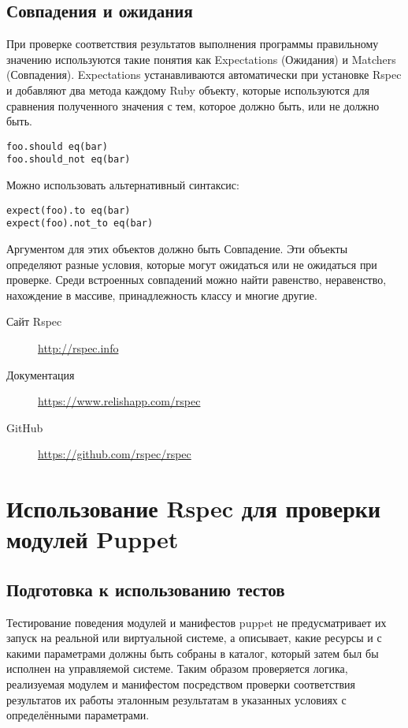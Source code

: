 \subsection{Совпадения и ожидания}

При проверке соответствия результатов выполнения программы правильному значению используются такие понятия как Expectations (Ожидания) и Matchers (Совпадения). Expectations устанавливаются автоматически при установке Rspec и добавляют два метода каждому Ruby объекту, которые используются для сравнения полученного значения с тем, которое должно быть, или не должно быть.

\begin{verbatim}
foo.should eq(bar)
foo.should_not eq(bar)
\end{verbatim}

Можно использовать альтернативный синтаксис:

\begin{verbatim}
expect(foo).to eq(bar)
expect(foo).not_to eq(bar) 
\end{verbatim}

Аргументом для этих объектов должно быть Совпадение. Эти объекты определяют разные условия, которые могут ожидаться или не ожидаться при проверке. Среди встроенных совпадений можно найти равенство, неравенство, нахождение в массиве, принадлежность классу и многие другие.

\begin{description}
\item[Сайт Rspec] \url{http://rspec.info}
\item[Документация] \url{https://www.relishapp.com/rspec}
\item[GitHub] \url{https://github.com/rspec/rspec}
\end{description}


\section{Использование Rspec для проверки модулей Puppet}

\subsection{Подготовка к использованию тестов}

Тестирование поведения модулей и манифестов puppet не предусматривает их запуск на реальной или виртуальной системе, а описывает, какие ресурсы и с какими параметрами должны быть собраны в каталог, который затем был бы исполнен на управляемой системе. Таким образом проверяется логика, реализуемая модулем и манифестом посредством проверки соответствия результатов их работы эталонным результатам в указанных условиях с определёнными параметрами.

